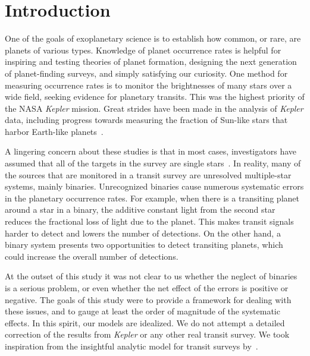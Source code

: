 \documentclass[12pt,modern]{aastex61}
\begin{document}
\section{Introduction}

One of the goals of exoplanetary science is to establish how common,
or rare, are planets of various types.  Knowledge of planet occurrence
rates is helpful for inspiring and testing theories of planet
formation, designing the next generation of planet-finding surveys,
and simply satisfying our curiosity.  One method for measuring
occurrence rates is to monitor the brightnesses of many stars over a
wide field, seeking evidence for planetary transits.  This was the
highest priority of the NASA {\it Kepler} mission.  Great strides have
been made in the analysis of {\it Kepler} data, including progress
towards measuring the fraction of Sun-like stars that harbor
Earth-like planets~\citep{
  youdin_exoplanet_2011,petigura_prevalence_2013,dong_fast_2013,
  foreman-mackey_exoplanet_2014,burke_terrestrial_2015}.

A lingering concern about these studies is that in most cases,
investigators have assumed that all of the targets in the survey
are single stars~\citep[\textit{e.g.},][]{
  howard_planet_2012,fressin_false_2013,
  dressing_occurrence_2015,burke_terrestrial_2015}. 
In reality, many of the sources that are monitored in a transit survey are
unresolved multiple-star systems, mainly binaries.  Unrecognized
binaries cause numerous systematic errors in the planetary occurrence
rates.  For example, when there is a transiting planet around a star
in a binary, the additive constant light from the second star reduces
the fractional loss of light due to the planet.  This makes transit
signals harder to detect and lowers the number of detections.  On the
other hand, a binary system presents two opportunities to detect
transiting planets, which could increase the overall number of
detections.

At the outset of this study it was not clear to us whether the neglect
of binaries is a serious problem, or even whether the net effect of
the errors is positive or negative.  The goals of this study were to
provide a framework for dealing with these issues, and to gauge at
least the order of magnitude of the systematic effects.  In this
spirit, our models are idealized.  We do not attempt a detailed
correction of the results from {\it Kepler} or any other real transit
survey.  We took inspiration from the insightful analytic model for
transit surveys by~\citet{pepper_using_2003}.
\end{document}
